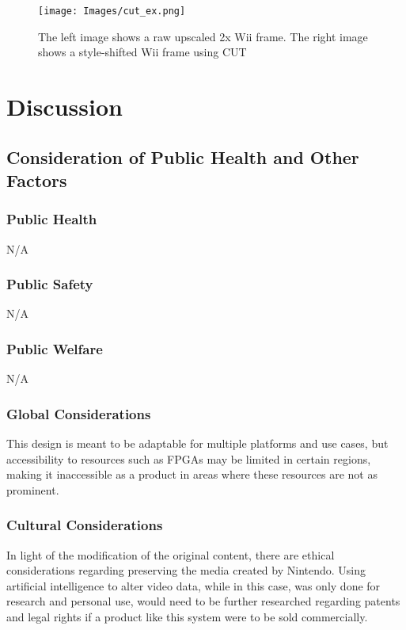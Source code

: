 \documentclass{article}
\begin{document}
        \begin{figure}[!tb] 
            \centering
            \texttt{[image: Images/cut\_ex.png]} 
            \caption{The left image shows a raw upscaled 2x Wii frame. The right image shows a style-shifted Wii frame using CUT} 
            \label{fig:cut_ex} 
        \end{figure}

    
\newpage\section{Discussion}   
    \subsection{Consideration of Public Health and Other Factors}
        \subsubsection{Public Health}
        \noindent N/A
        \subsubsection{Public Safety}
        \noindent N/A
        \subsubsection{Public Welfare}
        \noindent N/A
        \subsubsection{Global Considerations}
        \noindent This design is meant to be adaptable for multiple platforms and use cases, but accessibility to resources such as FPGAs may be limited in certain regions, making it inaccessible as a product in areas where these resources are not as prominent. 
        
        \subsubsection{Cultural Considerations}
        \noindent In light of the modification of the original content, there are ethical considerations regarding preserving the media created by Nintendo. Using artificial intelligence to alter video data, while in this case, was only done for research and personal use, would need to be further researched regarding patents and legal rights if a product like this system were to be sold commercially. 
\end{document}
